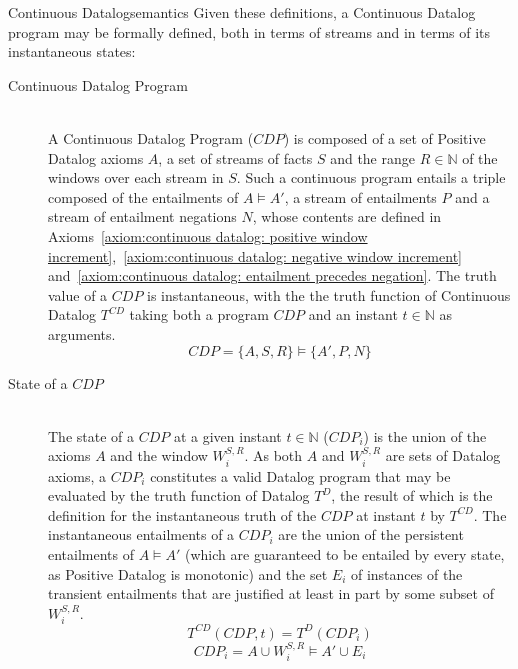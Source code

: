 \begin{nestedsection}{Continuous Datalog}{semantics}
	Given these definitions, a Continuous Datalog program may be formally defined, both in terms of streams and in terms of its instantaneous states:
	\begin{description}
		\item[Continuous Datalog Program\label{def:continuous datalog: CDP}]\hfill\\
			A Continuous Datalog Program (${CDP}$) is composed of a set of Positive Datalog axioms $A$, a set of streams of facts $S$ and the range ${R \in \mathbb{N}}$ of the windows over each stream in $S$.
			Such a continuous program entails a triple composed of the entailments of ${A \vDash A'}$, a stream of entailments $P$ and a stream of entailment negations $N$, whose contents are defined in Axioms~\ref{axiom:continuous datalog: positive window increment},~\ref{axiom:continuous datalog: negative window increment} and~\ref{axiom:continuous datalog: entailment precedes negation}.
			The truth value of a ${CDP}$ is instantaneous, with the the truth function of Continuous Datalog $T^{CD}$ taking both a program ${CDP}$ and an instant ${t \in \mathbb{N}}$ as arguments.
			\begin{equation*}
				CDP = \{A,S,R\} \vDash \{A',P,N\}
			\end{equation*}
		\item[State of a ${CDP}$\label{def:continuous datalog: CDPt}]\hfill\\
			The state of a ${CDP}$ at a given instant ${t \in \mathbb{N}}$ (${CDP_{i}}$) is the union of the axioms $A$ and the window $W^{S,R}_{i}$.
			As both $A$ and $W^{S,R}_{i}$ are sets of Datalog axioms, a ${CDP_{i}}$ constitutes a valid Datalog program that may be evaluated by the truth function of Datalog $T^{D}$, the result of which is the definition for the instantaneous truth of the ${CDP}$ at instant $t$ by $T^{CD}$.
			The instantaneous entailments of a $CDP_{i}$ are the union of the persistent entailments of ${A \vDash A'}$ (which are guaranteed to be entailed by every state, as Positive Datalog is monotonic) and the set $E_{i}$ of instances of the transient entailments that are justified at least in part by some subset of $W^{S,R}_{i}$. 
			\begin{equation*}
				T^{CD} \left( CDP, t \right) = T^{D} \left( CDP_{i} \right)
			\end{equation*}
			\begin{equation*}
				CDP_{i} = A \cup W^{S,R}_{i} \vDash A' \cup E_{i}
			\end{equation*}
	\end{description}

\end{nestedsection}
